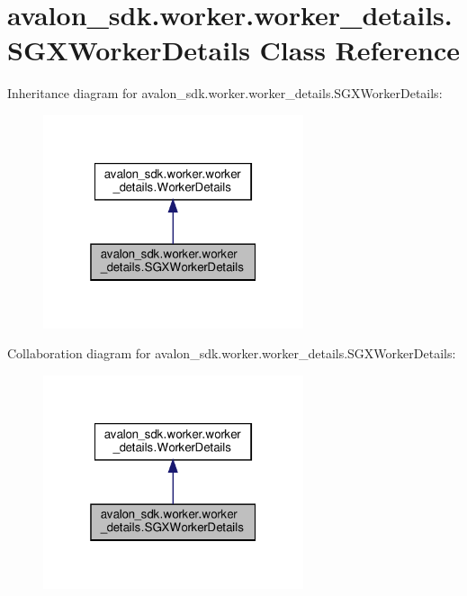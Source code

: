 \hypertarget{classavalon__sdk_1_1worker_1_1worker__details_1_1SGXWorkerDetails}{}\section{avalon\+\_\+sdk.\+worker.\+worker\+\_\+details.\+S\+G\+X\+Worker\+Details Class Reference}
\label{classavalon__sdk_1_1worker_1_1worker__details_1_1SGXWorkerDetails}


Inheritance diagram for avalon\+\_\+sdk.\+worker.\+worker\+\_\+details.\+S\+G\+X\+Worker\+Details\+:
\nopagebreak
\begin{figure}[H]
\begin{center}
\leavevmode
\includegraphics[width=217pt]{classavalon__sdk_1_1worker_1_1worker__details_1_1SGXWorkerDetails__inherit__graph}
\end{center}
\end{figure}


Collaboration diagram for avalon\+\_\+sdk.\+worker.\+worker\+\_\+details.\+S\+G\+X\+Worker\+Details\+:
\nopagebreak
\begin{figure}[H]
\begin{center}
\leavevmode
\includegraphics[width=217pt]{classavalon__sdk_1_1worker_1_1worker__details_1_1SGXWorkerDetails__coll__graph}
\end{center}
\end{figure}
